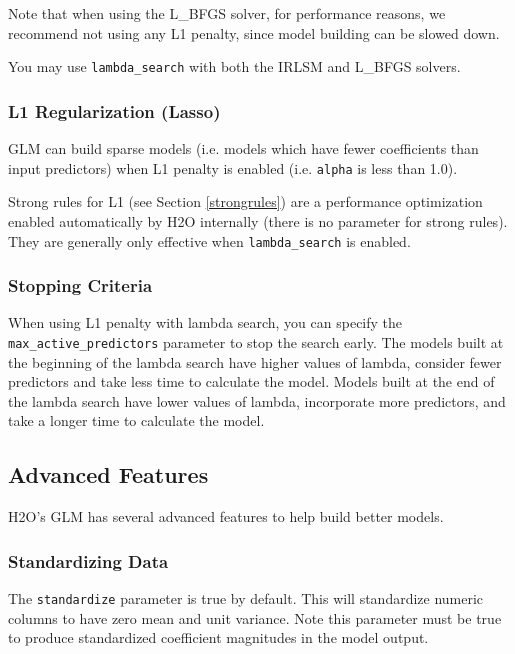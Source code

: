 Note that when using the L\_BFGS solver, for performance reasons, we recommend not using any L1 penalty, since
model building can be slowed down.

You may use \texttt{lambda\_search} with both the IRLSM and L\_BFGS solvers.

\subsubsection{L1 Regularization (Lasso)}

GLM can build sparse models (i.e. models which have fewer coefficients than input predictors) when L1 penalty is
enabled (i.e. \texttt{alpha} is less than 1.0).

Strong rules for L1 (see Section \ref{strongrules}) are a performance optimization enabled automatically by H2O
internally (there is no parameter for strong rules).  They are generally only effective when
\texttt{lambda\_search} is enabled.

\subsubsection{Stopping Criteria}

When using L1 penalty with lambda search, you can specify the \texttt{max\_active\_predictors} parameter to stop
the search early.  The models built at the beginning of the lambda search have higher values of lambda, consider
fewer predictors and take less time to calculate the model.  Models built at the end of the lambda search have
lower values of lambda, incorporate more predictors, and take a longer time to calculate the model.

\bigskip
\waterExampleInR


\subsection{Advanced Features}

H2O's GLM has several advanced features to help build better models.

\subsubsection{Standardizing Data}

The \texttt{standardize} parameter is true by default.  This will standardize numeric columns to have zero mean and
unit variance.  Note this parameter must be true to produce standardized coefficient magnitudes in the model
output.

